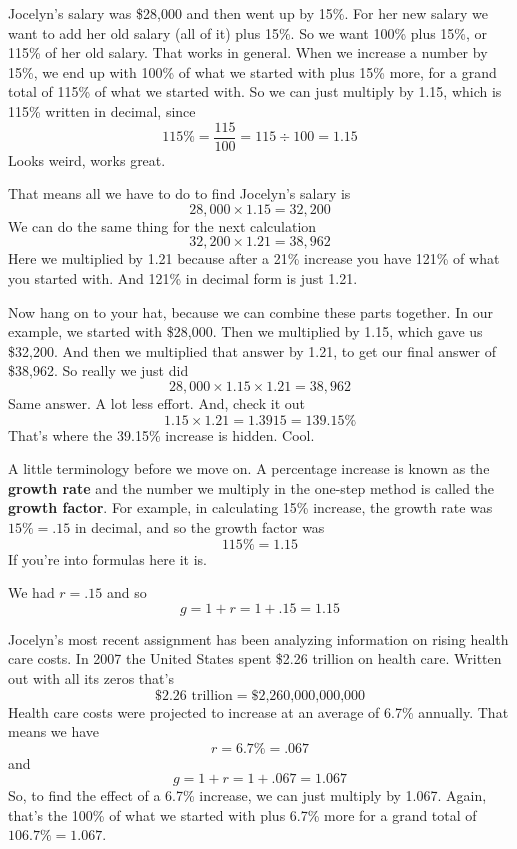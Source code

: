 Jocelyn's salary was \$28,000 and then went up by 15\%.  For her new salary we want to add her old salary (all of it) plus 15\%.  So we want 100\% plus 15\%, or 115\% of her old salary.   That works in general.  When we increase a number by 15\%, we end up with 100\% of what we started with plus 15\% more, for a grand total of 115\% of what we started with. So we can just multiply by 1.15, which is 115\% written in decimal, since $$115\% = \frac{115}{100} = 115 \div 100 = 1.15$$ Looks weird, works great.    

That means all we have to do to find Jocelyn's salary is $$28,000 \times 1.15 = 32,200$$  We can do the same thing for the next calculation $$32,200 \times 1.21 = 38,962$$  
Here we multiplied by 1.21 because after a 21\% increase you have 121\% of what you started with.  And 121\% in decimal form is just 1.21. 

Now hang on to your hat, because we can combine these parts together.  In our example, we started with \$28,000.  Then we multiplied by 1.15, which gave us \$32,200.  And then we multiplied that answer by 1.21, to get our final answer of \$38,962.  So really we just did 
$$28,000 \times 1.15 \times 1.21 = 38,962$$  Same answer.  A lot less effort.
And, check it out $$1.15 \times 1.21 = 1.3915 =139.15\%$$ That's where the 39.15\% increase is hidden. Cool.

A little terminology before we move on.  A percentage increase is known as the \textbf{growth rate} and the number we multiply in the one-step method is called the \textbf{growth factor}.  For example, in calculating 15\% increase, the growth rate was $15\%=.15$ in decimal, and so the growth factor was $$115\%=1.15$$  If you're into formulas here it is. 

 \bigskip
 \bigskip
  
 \noindent We had $r=.15$ and so $$g=1+r=1+.15=1.15$$

Jocelyn's most recent assignment has been analyzing information on rising health care costs.  In 2007 the United States spent \$2.26 trillion on health care. 
Written out with all its zeros that's $$\$2.26 \text{ trillion} =  \text{\$2,260,000,000,000}$$
Health care costs were projected to increase at an average of 6.7\% annually.
That means we have
$$r= 6.7\% = .067$$ and $$g=1+r=1+.067=1.067$$  So, to find the effect of a 6.7\% increase, we can just multiply by 1.067.  Again, that's the 100\% of what we started with plus 6.7\% more for a grand total of $106.7\%= 1.067$.
  
